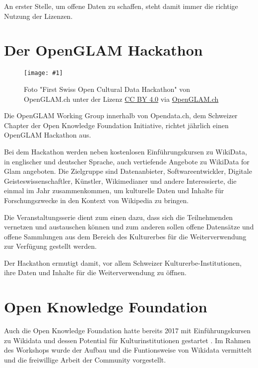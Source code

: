 \documentclass{article}
\newlength{\imgwidth}
\newcommand\scaledgraphics[2]{%
                
\settowidth{\imgwidth}{\texttt{[image: \#1]}}%
                
\setlength{\imgwidth}{\minof{\imgwidth}{#2\textwidth}}%
                
\texttt{[image: \#1]}%
                
}
\begin{document}
An erster Stelle, um offene Daten zu schaffen, steht damit immer die richtige Nutzung der Lizenzen. \autocite{noauthor_openglam_nodate}


\section{Der OpenGLAM Hackathon}\label{H2719449}


\begin{wrapfigure}{l}{0.5\textwidth}
\scaledgraphics{7b6890a5-883b-4d11-9a51-d9548403ca3f.jpg}{0.5}
\caption*{Foto "First Swiss Open Cultural Data Hackathon" von OpenGLAM.ch unter der Lizenz \href{https://https://creativecommons.org/licenses/by/4.0/deed.de}{CC BY 4.0} via \href{https://https://glam.opendata.ch/hackathons/}{OpenGLAM.ch}}\label{F31606501}
\end{wrapfigure}


Die OpenGLAM Working Group innerhalb von Opendata.ch, dem Schweizer Chapter der Open Knowledge Foundation Initiative, richtet jährlich einen OpenGLAM Hackathon aus. \autocite{regenscheit_hackathons_2015}


Bei dem Hackathon werden neben kostenlosen Einführungskursen zu WikiData, in englischer und deutscher Sprache, auch vertiefende Angebote zu WikiData for Glam angeboten. Die Zielgruppe sind Datenanbieter, Softwareentwickler, Digitale Geisteswissenschaftler, Künstler, Wikimedianer und andere Interessierte, die einmal im Jahr zusammenkommen, um kulturelle Daten und Inhalte für Forschungszwecke in den Kontext von Wikipedia zu bringen.


Die Veranstaltungsserie dient zum einen dazu, dass sich die Teilnehmenden vernetzen und austauschen können und zum anderen sollen offene Datensätze und offene Sammlungen aus dem Bereich des Kulturerbes für die Weiterverwendung zur Verfügung gestellt werden.


Der Hackathon ermutigt damit, vor allem Schweizer Kulturerbe-Institutionen, ihre Daten und Inhalte für die Weiterverwendung zu öffnen. \autocite{andrea_wikidata_2021}


\section{Open Knowledge Foundation}\label{H3830330}



Auch die Open Knowledge Foundation hatte bereits 2017 mit Einführungskursen zu Wikidata und dessen Potential für Kulturinstitutionen gestartet . Im Rahmen des Workshops wurde der Aufbau und die Funtionsweise von Wikidata vermittelt und die freiwillige Arbeit der Community vorgestellt. 
\end{document}
